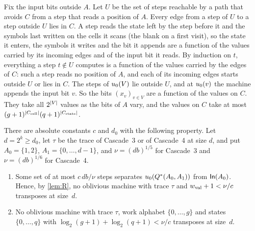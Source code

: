 \begin{informalproof}
Fix the input bits outside $A$. Let $U$ be the set of steps reachable by a path that avoids $C$ from a step that reads a position of
$A$. Every edge from a step of $U$ to a step outside $U$ lies in $C$. A step reads the state left by the step before it and the
symbols last written on the cells it scans (the blank on a first visit), so the state it enters, the symbols it writes and the bit it
appends are a function of the values carried by its incoming edges and of the input bit it reads. By induction on $t$, everything a
step $t\notin U$ computes is a function of the values carried by the edges of $C$: such a step reads no position of $A$, and each of
its incoming edges starts outside $U$ or lies in $C$. The steps of $u_0(V)$ lie outside $U$, and at $u_0(v)$ the machine appends
the input bit $v$. So the bits $(x_v)_{v\in V}$ are a function of the values on $C$. They take all $2^{\lvert V \rvert}$ values as the bits of
$A$ vary, and the values on $C$ take at most $(g+1)^{\lvert C_{\mathrm{cell}} \rvert}(q+1)^{\lvert C_{\mathrm{state}} \rvert}$.
\end{informalproof}

\begin{theorem}\label{thm:cascade-cuts}
\notformalized
There are absolute constants $c$ and $d_0$ with the following property. Let $d=2^k\ge d_0$, let $\tau$ be the trace of Cascade~3 or
of Cascade~4 at size $d$, and put $A_0=\{1,2\}$, $A_1=\{0,\dots,d-1\}$, and $\nu=(db)^{1/5}$ for Cascade~3 and $\nu=(db)^{1/6}$ for
Cascade~4.
\begin{enumerate}[label=(\alph*)]
\item Some set of at most $c\,db/\nu$ steps separates $u_0(Q^{*}(A_0,A_1))$ from $\mathsf{In}(A_0)$. Hence, by \cref{lem:R}, no oblivious
machine with trace $\tau$ and $w_{\mathrm{val}}+1<\nu/c$ transposes at size~$d$.
\item No oblivious machine with trace $\tau$, work alphabet $\{0,\dots,g\}$ and states $\{0,\dots,q\}$ with
$\log_2(g+1)+\log_2(q+1)<\nu/c$ transposes at size~$d$.
\end{enumerate}
\end{theorem}

